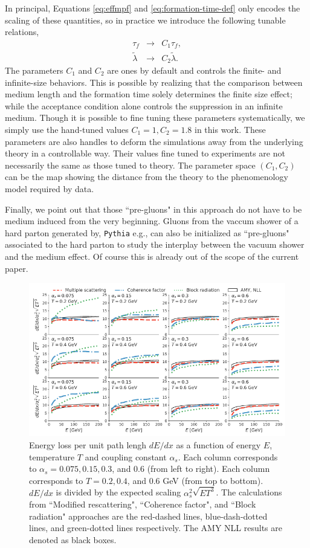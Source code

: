 \documentclass[aps, prc, reprint, amsmath, groupedaddress, nofootinbib]{revtex4-1}
\begin{document}
In principal, Equations \ref{eq:effmpf} and \ref{eq:formation-time-def} only encodes the scaling of these quantities, so in practice we introduce the following tunable relations,
\begin{eqnarray}\label{eq:tune}
\nonumber
\tau_f & \rightarrow & C_1 \tau_f, \\
\tilde{\lambda} & \rightarrow & C_2 \tilde{\lambda}.
\end{eqnarray}
The parameters $C_1$ and $C_2$ are ones by default and controls the finite- and infinite-size behaviors. 
This is possible by realizing that the comparison between medium length and the formation time solely determines the finite size effect; while the acceptance condition alone controls the suppression in an infinite medium.
Though it is possible to fine tuning these parameters systematically, we simply use the hand-tuned values $C_1 = 1, C_2 = 1.8$ in this work.
These parameters are also handles to deform the simulations away from the underlying theory in a controllable way.
Their values fine tuned to experiments are not necessarily the same as those tuned to theory. 
The parameter space $(C_1, C_2)$ can be the map showing the distance from the theory to the phenomenology model required by data.

Finally, we point out that those ``pre-gluons" in this approach do not have to be medium induced from the very beginning. 
Gluons from the vaccum shower of a hard parton generated by, {\tt Pythia} e.g., can also be initialized as ``pre-gluons" associated to the hard parton to study the interplay between the vacuum shower and the medium effect.
Of course this is already out of the scope of the current paper.

\begin{figure}
\includegraphics[width=\textwidth]{Eloss_infinite.pdf}
\caption{Energy loss per unit path lengh $dE/dx$ as a function of energy $E$, temperature $T$ and coupling constant $\alpha_s$. Each column corresponds to $\alpha_s = 0.075, 0.15, 0.3$, and $0.6$ (from left to right). Each column corresponds to $T = 0.2, 0.4$, and $0.6$ GeV (from top to bottom). $dE/dx$ is divided by the expected scaling $\alpha_s^2 \sqrt{ET^3}$. The calculations from ``Modified rescattering", ``Coherence factor", and ``Block radiation" approaches are the red-dashed lines, blue-dash-dotted lines, and green-dotted lines respectively. The AMY NLL results are denoted as black boxes.}
\label{fig:eloss-inf}
\end{figure}
\end{document}
